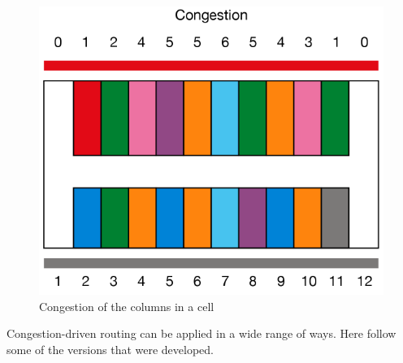 \begin{figure}[h!]
  \centering
  \includegraphics[scale=0.5]{img/design/congestion.png}
  \caption{Congestion of the columns in a cell}
  \label{fig:congestion}
\end{figure} 

Congestion-driven routing can be applied in a wide range of ways. Here follow some of the versions that were developed. \\

